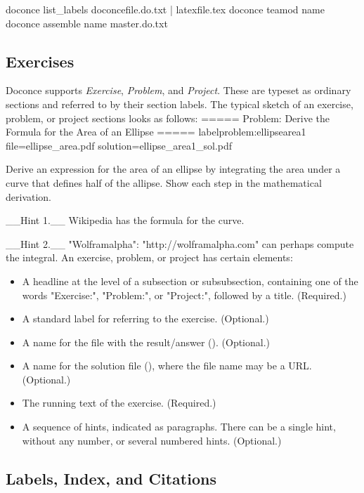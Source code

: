 \documentclass{book}
\begin{document}
{doconce list_labels doconcefile.do.txt | latexfile.tex
doconce teamod name
doconce assemble name master.do.txt
\eshpro

\subsection{Exercises}

Doconce supports \emph{Exercise}, \emph{Problem}, and \emph{Project}. These are typeset
as ordinary sections and referred to by their section labels.
The typical sketch of an exercise, problem, or project sections
looks as follows:
\bccq
===== Problem: Derive the Formula for the Area of an Ellipse =====
label{problem:ellipsearea1}
file=ellipse_area.pdf
solution=ellipse_area1_sol.pdf

Derive an expression for the area of an ellipse by integrating
the area under a curve that defines half of the allipse.
Show each step in the mathematical derivation.

__Hint 1.__ Wikipedia has the formula for the curve.

__Hint 2.__ "Wolframalpha": "http://wolframalpha.com" can perhaps
compute the integral.
\eccq
An exercise, problem, or project has certain elements:

\begin{itemize}
  \item A headline at the level of a subsection or subsubsection,
    containing one of the words "Exercise:", "Problem:", or
    "Project:", followed by a title. (Required.)

  \item A standard label for referring to the exercise. (Optional.)

  \item A name for the file with the result/answer (). (Optional.)

  \item A name for the solution file (), where the file
    name may be a URL. (Optional.)

  \item The running text of the exercise. (Required.)

  \item A sequence of hints, indicated as paragraphs. There can be a
    single hint, without any number, or several numbered hints.
    (Optional.)
\end{itemize}

\noindent

\subsection{Labels, Index, and Citations}

}
\end{document}

